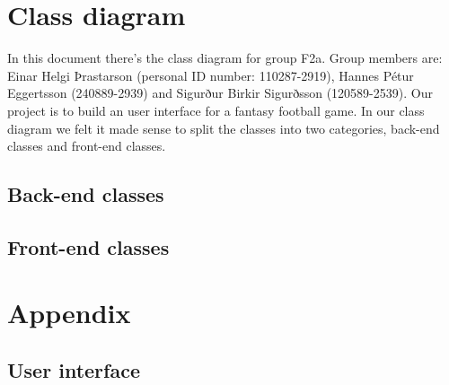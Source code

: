 \documentclass{article}
\begin{document}
\section{Class diagram}
In this document there's the class diagram for group F2a. Group members are: Einar Helgi Þrastarson (personal ID number: 110287-2919), Hannes Pétur Eggertsson (240889-2939) and Sigurður Birkir Sigurðsson (120589-2539). Our project is to build an user interface for a fantasy football game. In our class diagram we felt it made sense to split the classes into two categories, back-end classes and front-end classes.

%
\subsection{Back-end classes}

%
\subsection{Front-end classes}

\newpage
\section*{Appendix}
\subsection*{User interface}
\end{document}
